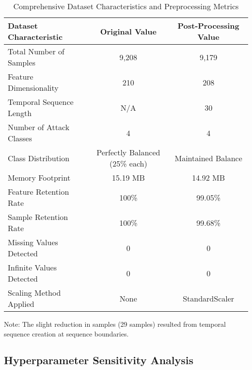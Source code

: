 \begin{table}[H]
	\centering
	\renewcommand{\arraystretch}{1.15}
	\setlength{\tabcolsep}{4pt} 
	\caption{Comprehensive Dataset Characteristics and Preprocessing Metrics}
	\label{tab:detailed-dataset}
	\begin{threeparttable}
		\begin{tabular}{@{}p{5cm}cc@{}}
			\toprule
			\textbf{Dataset Characteristic} & \textbf{Original Value} & \textbf{Post-Processing Value} \\
			\midrule
			Total Number of Samples & 9,208 & 9,179 \\
			Feature Dimensionality & 210 & 208 \\
			Temporal Sequence Length & N/A & 30 \\
			Number of Attack Classes & 4 & 4 \\
			Class Distribution & Perfectly Balanced (25\% each) & Maintained Balance \\
			Memory Footprint & 15.19 MB & 14.92 MB \\
			Feature Retention Rate & 100\% & 99.05\% \\
			Sample Retention Rate & 100\% & 99.68\% \\
			Missing Values Detected & 0 & 0 \\
			Infinite Values Detected & 0 & 0 \\
			Scaling Method Applied & None & StandardScaler \\
			\bottomrule
		\end{tabular}
		\begin{tablenotes}[flushleft]
			\small
			\setlength{\itemindent}{-2.5pt}
			\item[] Note: The slight reduction in samples (29 samples) resulted from temporal sequence creation at sequence boundaries.
		\end{tablenotes}
	\end{threeparttable}
\end{table}




\subsection{Hyperparameter Sensitivity Analysis}
\label{appendix:hyperparameters}


